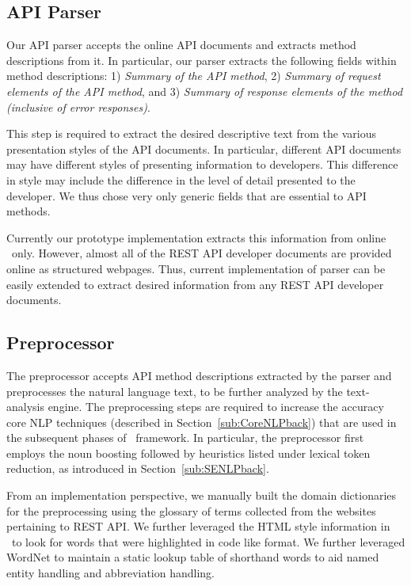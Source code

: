 \subsection{API Parser}
\label{sub:parser}

Our API parser accepts the online API documents and extracts method descriptions from it.
In particular, our parser extracts the following fields within method descriptions: 
1) \textit{Summary of the API method},
2) \textit{Summary of request elements of the API method}, and 
3) \textit{Summary of response elements of the method (inclusive of error responses)}.

This step is required to extract the desired descriptive text from the various presentation styles of the API documents.
In particular, different API documents may have different styles of presenting information to developers.
This difference in style may include the difference in the level of detail presented to the developer.
We thus chose very only generic fields that are essential to API methods. 

Currently our prototype implementation extracts this information from online \amazon\ only. 
However, almost all of the REST API developer documents are provided online as structured webpages.
Thus, current implementation of parser can be easily extended to extract desired information from any REST API developer documents.    


\subsection{Preprocessor}
\label{sub:Preprocessor}

The preprocessor accepts API method descriptions extracted by the parser and preprocesses the natural language text, to be further analyzed by the text-analysis engine.
The preprocessing steps are required to increase the accuracy core NLP techniques (described in Section~\ref{sub:CoreNLPback}) that are used in the subsequent phases of \tool\ framework.
In particular, the preprocessor first employs the noun boosting followed by heuristics listed under lexical token reduction, as introduced in Section~\ref{sub:SENLPback}.

From an implementation perspective, we manually built the domain dictionaries for the preprocessing using the glossary of terms collected from the websites pertaining to REST API.
We further leveraged the HTML style information in \amazon\ to look for words that were highlighted in code like format. We further leveraged WordNet to maintain a static lookup table of shorthand words to aid named entity handling and abbreviation handling. 

